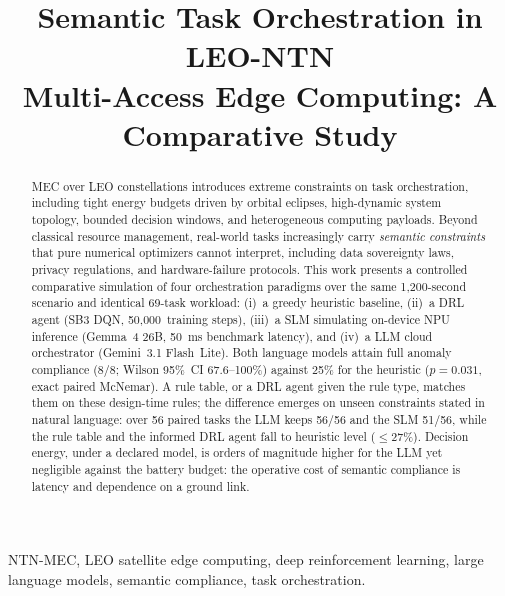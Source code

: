 \documentclass[conference,comsoc,twoside,caption=false]{IEEEtran}
\theoremstyle{definition}
\begin{document}
\author{
}
\title{\huge Semantic Task Orchestration in LEO-NTN\\
Multi-Access Edge Computing:
A Comparative Study}
\maketitle
    \newcommand{\MYheader}{\smash{\scriptsize
    \hfil\parbox[t][\height][t]{\textwidth}{\centering {}}\hfil\hbox{}}}
    \makeatletter
    \def\ps@IEEEtitlepagestyle{%
    \def\@oddhead{\MYheader}%
    \def\@evenhead{\MYheader}%
    \def\@oddfoot{}%
    \def\@evenfoot{}}
    \makeatother
    \pagestyle{headings}
    \addtolength{\footskip}{0\baselineskip}
    \addtolength{\textheight}{-0.1\baselineskip}
\begin{abstract}
\ac{MEC} over \ac{LEO} constellations introduces extreme constraints on task orchestration, including tight energy budgets driven by orbital eclipses, high-dynamic system topology, 
bounded decision windows, and heterogeneous computing payloads.
Beyond classical resource management, real-world tasks increasingly carry
\emph{semantic constraints} that pure numerical optimizers cannot interpret, including data sovereignty laws, privacy regulations, and
hardware-failure protocols. 
This work presents a controlled comparative simulation of four orchestration
paradigms over the same 1{,}200-second scenario and identical 69-task workload:
(i)~a greedy heuristic baseline, (ii)~a \ac{DRL} agent (SB3 DQN,
50{,}000~training steps), (iii)~a \ac{SLM} simulating on-device \ac{NPU}
inference (Gemma~4 26B, \SI{50}{\milli\second} benchmark latency), and
(iv)~a \ac{LLM} cloud orchestrator (Gemini~3.1 Flash~Lite). Both language models attain full anomaly compliance (8/8; Wilson 95\%~CI
67.6--100\%) against 25\% for the heuristic ($p=0.031$, exact paired McNemar). A
rule table, or a DRL agent given the rule type, matches them on these design-time
rules; the difference emerges on unseen constraints stated in natural language:
over 56 paired tasks the LLM keeps 56/56 and the SLM 51/56, while the rule table
and the informed DRL agent fall to heuristic level ($\leq$27\%). Decision energy, under a declared model, is orders of magnitude
higher for the LLM yet negligible against the battery budget: the operative cost
of semantic compliance is latency and dependence on a ground link.
\end{abstract}
\begin{IEEEkeywords}
NTN-MEC, LEO satellite edge computing, deep reinforcement learning,
large language models, semantic compliance, task orchestration.
\end{IEEEkeywords}
\acresetall
\IEEEpeerreviewmaketitle
\end{document}
